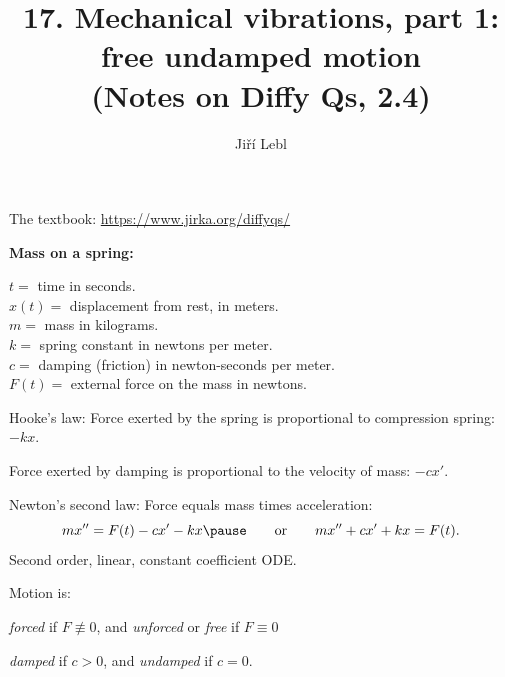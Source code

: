 \documentclass[10pt,aspectratio=169]{beamer}
\author{Ji\v{r}\'i Lebl}
\institute[OSU]{%
Oklahoma State University%
}
\title{17. Mechanical vibrations, part 1: free undamped motion\\(Notes on Diffy Qs, 2.4)}
\date{}
\begin{document}
\begin{frame}
\titlepage


\begin{center}
The textbook: \url{https://www.jirka.org/diffyqs/}
\end{center}
\end{frame}

\begin{frame}
\textbf{Mass on a spring:}

\vspace*{-12pt}
\hspace*{3in}%

\vspace*{-0.55in}
$t = {}$ time in seconds.\\
$x(t) = {}$ displacement from rest, in meters.\\
$m = {}$ mass in kilograms.\\
$k = {}$ spring constant in newtons per meter.\\
$c = {}$ damping (friction) in newton-seconds per meter.\\
$F(t) = {}$ external force on the mass in newtons.

\medskip
\pause

Hooke's law: 
Force exerted by the spring is proportional to
compression spring: $-kx$.

\pause
Force exerted by damping is proportional to the velocity of mass: $-cx'$.

\pause
Newton's second law: Force equals mass times acceleration:
\[
mx'' = F(t)-cx'-kx
\pause
\qquad
\text{or}
\qquad
mx'' + cx' + kx = F(t) .
\]
\pause
Second order, linear, constant coefficient ODE.

\medskip
\pause

Motion is:

\vspace*{-12pt}%
\hspace*{1in}%
\emph{forced} if $F \not\equiv 0$, \quad and
\emph{unforced} or \emph{free} if $F \equiv 0$

\pause
\hspace*{1in}%
\emph{damped} if $c > 0$, \quad
and \emph{undamped} if $c = 0$.
\end{frame}
\end{document}
